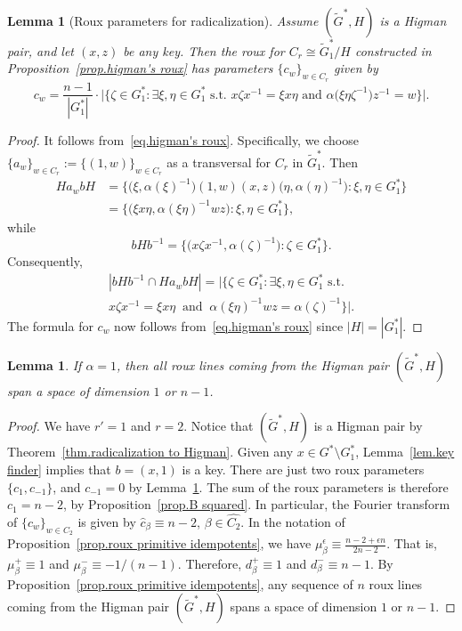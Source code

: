 \documentclass[11pt]{article}
\newtheorem{lemma}[theo]{Lemma}
\theoremstyle{definition}
\numberwithin{equation}{section}
\begin{document}
\begin{lemma}[Roux parameters for radicalization]
\label{lem.cgs of radical roux}
Assume $(\widetilde{G}^*,H)$ is a Higman pair, and let $(x,z)$ be any key.
Then the roux for $C_r\cong \widetilde{G}_1^*/H$ constructed in Proposition~\ref{prop.higman's roux} has parameters $\{c_{w}\}_{w\in C_r}$ given by
\[
c_{w}
=\frac{n-1}{|G^*_1|}\cdot\Big|\Big\{\zeta \in G^*_1:
\exists \xi,\eta \in G^*_1
\text{ s.t. }
x\zeta x^{-1}=\xi x\eta
\text{ and }
\alpha\bigl( \xi \eta \zeta^{-1} \bigr) z^{-1} = w
\Big\}\Big|.
\]
\end{lemma}

\begin{proof}
It follows from~\eqref{eq.higman's roux}.
Specifically, we choose $\{ a_w \}_{w \in C_r} := \{ (1,w) \}_{w \in C_r}$ as a transversal for $C_r$ in $\widetilde{G}_1^*$.
Then
\begin{align*}
H a_w b H &= \bigl\{ \bigl( \xi, \alpha(\xi)^{-1} \bigr)(1,w)(x,z)\bigl( \eta, \alpha(\eta)^{-1} \bigr) : \xi, \eta \in G_1^* \bigr\} \\
&= \bigl\{ \bigl( \xi x \eta, \alpha(\xi \eta)^{-1} wz\bigr) : \xi, \eta \in G_1^* \bigr\},
\end{align*}
while
\[ bHb^{-1} = \bigl\{ \bigl( x \zeta x^{-1}, \alpha(\zeta)^{-1} \bigr) : \zeta \in G_1^* \big\}. \]
Consequently,
\begin{multline*}
| bHb^{-1} \cap H a_w b H | = \big|\big\{\zeta \in G^*_1:
\exists \xi,\eta \in G^*_1
\text{ s.t. } \\
x \zeta x^{-1} =  \xi x \eta
\;\;
\text{and}
\;\;
\alpha(\xi \eta)^{-1}wz  = \alpha(\zeta)^{-1}
\big\}\big|.
\end{multline*}
The formula for $c_w$ now follows from~\eqref{eq.higman's roux} since $|H| = |G_1^*|$.
\end{proof}


\begin{lemma}
\label{lem.alpha=1 is dumb}
If $\alpha = 1$, then all roux lines coming from the Higman pair $(\widetilde{G}^*,H)$ span a space of dimension $1$ or $n-1$.
\end{lemma}

\begin{proof}
We have $r'=1$ and $r=2$.
Notice that $(\widetilde{G}^*,H)$ is a Higman pair by Theorem~\ref{thm.radicalization to Higman}.
Given any $x \in G^* \setminus G_1^*$, Lemma~\ref{lem.key finder} implies that $b=(x,1)$ is a key.
There are just two roux parameters $\{ c_1,c_{-1}\}$, and $c_{-1} = 0$ by Lemma~\ref{lem.cgs of radical roux}.
The sum of the roux parameters is therefore $c_1 = n-2$, by Proposition~\ref{prop.B squared}.
In particular, the Fourier transform of $\{ c_w \}_{w \in C_2}$ is given by $\hat{c}_\beta \equiv n-2$, $\beta \in\widehat{C_2}$.
In the notation of Proposition~\ref{prop.roux primitive idempotents}, we have $\mu_\beta^\epsilon \equiv \frac{n-2 + \epsilon n}{2n-2}$.
That is,  $\mu_\beta^+ \equiv 1$ and $\mu_\beta^- \equiv -1/(n-1)$.
Therefore, $d_\beta^+ \equiv 1$ and $d_\beta^- \equiv n-1$.
By Proposition~\ref{prop.roux primitive idempotents}, any sequence of $n$ roux lines coming from the Higman pair $(\widetilde{G}^*,H)$ spans a space of dimension $1$ or $n-1$.
\end{proof}
\end{document}
